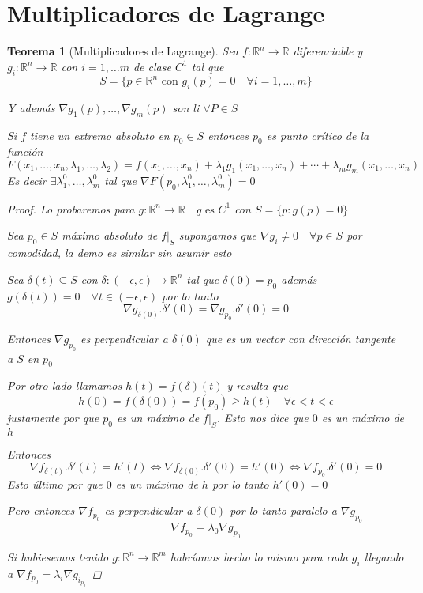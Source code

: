 \documentclass{article}
\theoremstyle{break}
\newtheorem{theorem}{Teorema}[section]
\begin{document}
\section{Multiplicadores de Lagrange}
\begin{theorem}[Multiplicadores de Lagrange]
  Sea $f:\mathbb{R}^{n} \longrightarrow  \mathbb{R} $ diferenciable y $g_i:\mathbb{R}^{n} \longrightarrow \mathbb{R}  $ 
  con $i=1,\ldots m$ de clase $C^1$ tal que $$S = \{ p\in \mathbb{R}^{n} \text{ con } g_i(p) = 0 \quad \forall i=1,\ldots,m\}$$

  Y además $\nabla g_1(p),\ldots,\nabla g_m(p)$ son li $\forall P\in S$

  Si $f$ tiene un extremo absoluto en $p_0 \in S$ entonces $p_0$ es punto crítico de la función 
  $$F(x_1,\ldots,x_n,\lambda_1,\ldots,\lambda_2) = f(x_1,\ldots,x_n) + \lambda_1 g_1(x_1,\ldots,x_n) + \cdots + \lambda_mg_m(x_1,\ldots,x_n)$$
  Es decir $\exists \lambda_1^0,\ldots ,\lambda_m^0$ tal que $\nabla F (p_0,\lambda_1^0,\ldots,\lambda_m^0) = 0$
  \begin{proof}
    Lo probaremos para $g:\mathbb{R}^{n} \longrightarrow  \mathbb{R}\quad g \text{ es } C^1$ con $S = \{p: g(p)=0\}$

    Sea $p_0\in S$ máximo absoluto de $f|_S$ supongamos que $\nabla g_i \neq 0 \quad \forall p \in S$ por comodidad, la demo es similar sin asumir esto

    Sea $\delta(t) \subseteq S$ con $\delta: (-\epsilon , \epsilon ) \rightarrow \mathbb{R}^{n} $ 
    tal que $\delta(0)=p_0$ además $g(\delta(t)) = 0\quad \forall t \in (-\epsilon ,\epsilon )$ por lo tanto 
    $$\nabla g_{\delta (0)}. \delta'(0) = \nabla g_{p_0}. \delta'(0)= 0$$

    Entonces $\nabla g_{p_0}$ es perpendicular a $\delta(0)$ que es un vector con dirección tangente a $S$ en $p_0$

    Por otro lado llamamos $h(t) = f(\delta)(t) $ y resulta que 
    $$h(0) = f(\delta(0)) = f(p_0) \geq h(t) \quad \forall \epsilon < t < \epsilon   $$ justamente por que $p_0$ es un máximo de $f|_S$. Esto nos dice que $0$ es un máximo de $h$

    Entonces $$\nabla f_{\delta(t)}.\delta'(t) = h'(t) \iff \nabla f_{\delta(0)}.\delta'(0) = h'(0) \iff \nabla f_{p_0}.\delta'(0) = 0$$
    Esto último por que $0$ es un máximo de $h$ por lo tanto $h'(0) = 0$

    Pero entonces $\nabla f_{p_0}$ es perpendicular a $\delta (0)$ por lo tanto paralelo a $\nabla g_{p_0}$
    $$\nabla f_{p_0} = \lambda_0\nabla g_{p_0}$$

    Si hubiesemos tenido $g:\mathbb{R}^{n} \longrightarrow  \mathbb{R}^{m} $ habríamos hecho lo mismo para cada $g_i$ 
    llegando a $\nabla f_{p_0} = \lambda_i \nabla g_i_{p_0}$
    
  \end{proof}
\end{theorem}
\end{document}

